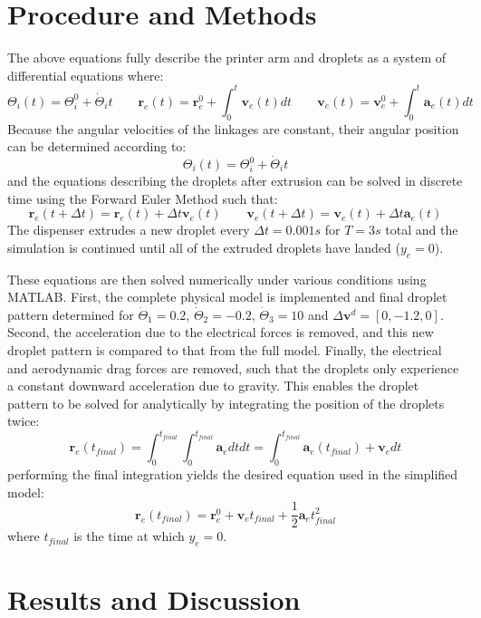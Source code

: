 \documentclass[a4paper,12pt]{report}
\begin{document}
\section{Procedure and Methods}
The above equations fully describe the printer arm and droplets as a system of differential equations where:
$$ \Theta_i(t) = \Theta_i^0 + \dot{\Theta}_i t \qquad \bm{r}_e(t) = \bm{r}_e^0 + \int_{0}^{t}\bm{v}_e(t) dt \qquad \bm{v}_e(t) = \bm{v}_e^0 + \int_{0}^{t}\bm{a}_e(t) dt$$
Because the angular velocities of the linkages are constant, their angular position can be determined according to:
$$ \Theta_i(t) = \Theta_i^0 + \dot{\Theta}_it $$
and the  equations describing the droplets after extrusion can be solved in discrete time using the Forward Euler Method such that:
$$ \bm{r}_e(t+\Delta t) = \bm{r}_e(t) + \Delta t \bm{v}_e(t) \qquad \bm{v}_e(t+\Delta t) = \bm{v}_e(t) + \Delta t \bm{a}_e(t) $$
The dispenser extrudes a new droplet every $\Delta t = 0.001s$ for $T = 3s$ total and the simulation is continued until all of the extruded droplets have landed ($y_e=0$).

These equations are then solved numerically under various conditions using MATLAB. First, the complete physical model is implemented and final droplet pattern determined for $\dot{\Theta}_1=0.2$,  $\dot{\Theta}_2=-0.2$, $\dot{\Theta}_3 = 10$ and $\Delta\bm{v}^d = [0, -1.2, 0]$. Second, the acceleration due to the electrical forces is removed, and this new droplet pattern is compared to that from the full model. Finally, the electrical and aerodynamic drag forces are removed, such that the droplets only experience a constant downward acceleration due to gravity. This enables the droplet pattern to be solved for analytically by integrating the position of the droplets twice:
$$ \bm{r}_e(t_{final}) = \int_{0}^{t_{final}}\int_{0}^{t_{final}}\bm{a}_e dt dt = \int_{0}^{t_{final}}\bm{a}_e(t_{final}) + \bm{v}_e dt$$
performing the final integration yields the desired equation used in the simplified model:
$$ \bm{r}_e(t_{final})= \bm{r}_e^0 + \bm{v}_e t_{final} + \frac{1}{2}\bm{a}_e t_{final}^2 $$
where $t_{final}$ is the time at which $y_e=0$.


\section{Results and Discussion}
\end{document}
